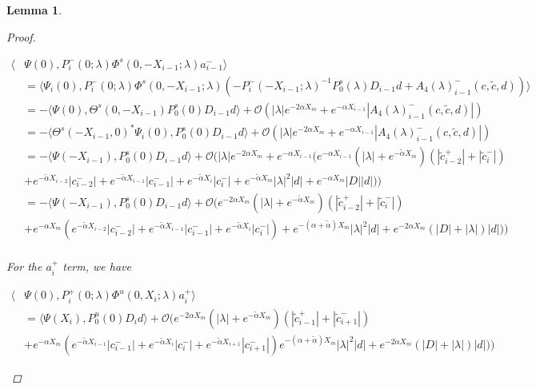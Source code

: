 \documentclass[12pt]{article}
\newtheorem{lemma}{Lemma}
\begin{document}
\begin{lemma}
\begin{proof}
\begin{enumerate}
\begin{align*}
\langle &\Psi(0), P_i^-(0; \lambda) \Phi^s(0, -X_{i-1}; \lambda) a_{i-1}^- \rangle \\
&= \langle \Psi_i(0), P_i^-(0; \lambda) \Phi^s(0, -X_{i-1}; \lambda) (- P_i^-(-X_{i-1}; \lambda)^{-1} P_0^s(\lambda) D_{i-1} d + A_4(\lambda)_{i-1}^-(c, \tilde{c}, d)) \rangle \\
&= -\langle \Psi(0), \Theta^s(0, -X_{i-1}) P_0^s(0) D_{i-1} d \rangle + \mathcal{O}( |\lambda|e^{-2 \alpha X_m} + e^{-\alpha X_{i-1}} |A_4(\lambda)_{i-1}^-(c, \tilde{c}, d)|)\\
&= -\langle \Theta^s(-X_{i-1}, 0)^* \Psi_i(0), P_0^s(0) D_{i-1} d \rangle + \mathcal{O}( |\lambda|e^{-2 \alpha X_m} + e^{-\alpha X_{i-1}} |A_4(\lambda)_{i-1}^-(c, \tilde{c}, d)|)\\
&= -\langle \Psi(-X_{i-1}), P_0^s(0) D_{i-1} d \rangle + \mathcal{O}\Big( |\lambda|e^{-2 \alpha X_m} + e^{-\alpha X_{i-1}} ( 
e^{-\alpha X_{i-1}}(|\lambda| + e^{-\tilde{\alpha}X_m})(|\tilde{c}_{i-2}^+| + |\tilde{c}_i^-|) \\
&+ e^{-\tilde{\alpha}X_{i-2}}|c_{i-2}^-| + e^{-\tilde{\alpha}X_{i-1}}|c_{i-1}^-| + e^{-\tilde{\alpha}X_i}|c_i^-| + e^{-\tilde{\alpha} X_m} |\lambda|^2|d| + e^{-\alpha X_m}|D||d|) \Big) \\
&= -\langle \Psi(-X_{i-1}), P_0^s(0) D_{i-1} d \rangle 
+ \mathcal{O}\Big(  
e^{-2 \alpha X_m}(|\lambda| + e^{-\tilde{\alpha}X_m})(|\tilde{c}_{i-2}^+| + |\tilde{c}_i^-|) \\
&+ e^{-\alpha X_m}( e^{-\tilde{\alpha}X_{i-2}}|c_{i-2}^-| + e^{-\tilde{\alpha}X_{i-1}}|c_{i-1}^-| + e^{-\tilde{\alpha}X_i}|c_i^-|) + e^{-(\alpha + \tilde{\alpha}) X_m} |\lambda|^2|d| + e^{-2 \alpha X_m}(|D| + |\lambda|)|d|) \Big) \\ 
\end{align*}

For the $a_i^+$ term, we have

\begin{align*}
\langle &\Psi(0), P_i^+(0; \lambda) \Phi^u(0, X_i; \lambda) a_i^+ \rangle \\
&= \langle \Psi(X_i), P_0^u(0) D_i d \rangle + \mathcal{O}\Big( e^{-2 \alpha X_m} (|\lambda| + e^{-\tilde{\alpha}X_m})(|\tilde{c}_{i-1}^+| + |\tilde{c}_{i+1}^-|) \\
&+ e^{-\alpha X_m}( e^{-\tilde{\alpha}X_{i-1}}|c_{i-1}^-| + e^{-\tilde{\alpha}X_i}|c_i^-| + e^{-\tilde{\alpha}X_{i+1}}|c_{i+1}^-|) e^{-(\alpha + \tilde{\alpha}) X_m} |\lambda|^2|d| + e^{-2 \alpha X_m}(|D| + |\lambda|)|d|) \Big)
\end{align*}


\end{enumerate}
\end{proof}
\end{lemma}
\end{document}
